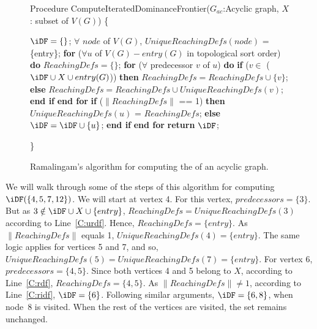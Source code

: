 {\begin{figure}[!ht]
\begin{minipage}[t]{5in}
    Procedure ComputeIteratedDominanceFrontier($G_{ac}$:Acyclic graph, $X$: subset of $V(G)$)
    \{
    \begin{code}

     $\iDF = \{\}$; 
     $\forall$ $node$ of $V(G)$, $UniqueReachingDefs(node)$ = \{entry\};
     {\bf for} ($\forall u$ of $V(G) - entry(G)$ in topological sort order) {\bf do}
        $ReachingDefs = \{\}$; 
        {\bf for} ($\forall$ predecessor $v$ of $u$) {\bf do}
          {\bf if} ($v \in$ ($\iDF \cup X \cup entry(G)$)) {\bf then} 
             $ReachingDefs = ReachingDefs \cup \{v\}$; \label{C:rdf}
          {\bf else} 
             $ReachingDefs = ReachingDefs \cup UniqueReachingDefs(v)$; \label{C:urdf}
          {\bf end if} 
       {\bf end for} 
       {\bf if} ($\|ReachingDefs\|$ == 1) {\bf then} \label{C:onerd}
          $UniqueReachingDefs(u)$ = $ReachingDefs$; 
       {\bf else} 
           $\iDF = \iDF \cup \{u\}$; \label{C:ridf}
       {\bf end if}    
     {\bf end for} 
     {\bf return} $\iDF$;   
     
    \end{code}
    \}
 
  \end{minipage}
  \caption{Ramalingam's algorithm for computing the \iDF of an acyclic graph.}
  \label{F:ramaIDF}
  \end{figure}

    We will walk through some of the steps of this algorithm for computing $\iDF(\{4,5,7,12\})$. We will start at vertex 4. For this vertex, $\textit{predecessors} = \{3\}$. But as $3 \notin \iDF \cup X \cup \{entry\}$, $\textit{ReachingDefs} = \textit{UniqueReachingDefs}(3)$ according to Line~\ref{C:urdf}. Hence, 
$\textit{ReachingDefs} = \{entry\}$. As $\|\textit{ReachingDefs}\|$ equals 1, $\textit{UniqueReachingDefs}(4) = \{entry\}$. The same logic applies for vertices 5 and 7, and so,  $\textit{UniqueReachingDefs}(5) = \textit{UniqueReachingDefs}(7) = \{entry\}$.
    For vertex 6, $\textit{predecessors} = \{4,5\}$.
    Since both vertices 4 and 5 belong to $X$, according to Line~\ref{C:rdf}, 
    $\textit{ReachingDefs} = \{4,5\}$.
    As $\|\textit{ReachingDefs}\| \neq 1$, according to Line~\ref{C:ridf}, $\iDF = \{6\}$.
    Following similar arguments, $\iDF = \{6,8\}$, when node~8 is visited. When the rest of the vertices
    are visited, the \iDF set remains unchanged. 

}
